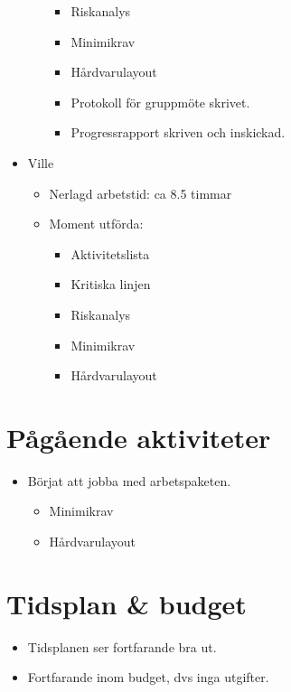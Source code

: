 \begin{itemize}[noitemsep]
\begin{itemize}[noitemsep]
\begin{itemize}[noitemsep]
            \item Riskanalys
            \item Minimikrav
            \item Hårdvarulayout
            \item Protokoll för gruppmöte skrivet.
            \item Progressrapport skriven och inskickad.
        \end{itemize}
    \end{itemize}
    \item Ville
    \begin{itemize}[noitemsep]
        \item Nerlagd arbetstid: ca 8.5 timmar
        \item Moment utförda:
        \begin{itemize}[noitemsep]
            \item Aktivitetslista
            \item Kritiska linjen
            \item Riskanalys
            \item Minimikrav
            \item Hårdvarulayout
        \end{itemize}
    \end{itemize}
\end{itemize}

\section{Pågående aktiviteter}
\begin{itemize}[noitemsep]
    \item Börjat att jobba med arbetspaketen.
    \begin{itemize}
    	\item Minimikrav
    	\item Hårdvarulayout
    \end{itemize}
\end{itemize}

\section{Tidsplan \& budget}
\begin{itemize}[noitemsep]
    \item Tidsplanen ser fortfarande bra ut.
    \item Fortfarande inom budget, dvs inga utgifter.
\end{itemize}

